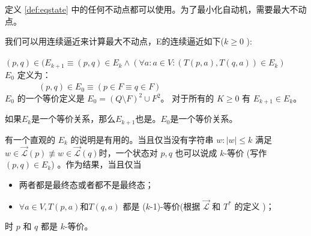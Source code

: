 \begin{remark}
    定义 \ref{def:eqstate} 中的任何不动点都可以使用。为了最小化自动机，需要最大不动点。
\end{remark}


\begin{property}[近似$E$]
    我们可以用连续逼近来计算最大不动点，E的连续逼近如下($ k \ge 0 $ ):\\
　　　　$(p,q) \in (E_{k+1} \equiv (p,q) \in E_k \land (\forall a:a \in V : (T(p,a),T(q,a))\in E_k ) $ \\
$E_0$ 定义为：\\
　　　　$(p,q) \in E_0 \equiv (p \in F \equiv q \in F)  $ \\
$E_0$ 的一个等价定义是 $E_0 = (Q \setminus F)^2 \cup F^2$。 对于所有的 $K \ge 0$ 有 $E_{k+1} \in E_k$。
\end{property}


\begin{remark}
    如果$E_k$是一个等价关系，那么$E_{k+1}$也是。$E_0$是一个等价关系。
\end{remark}


\begin{remark}
    有一个直观的 $E_k$ 的说明是有用的。当且仅当没有字符串 $ w: |w| \leq k $ 满足 $ w \in \overrightarrow{\mathcal{L}}(p) \not\equiv w \in \overrightarrow{\mathcal{L}}(q) $时，一个状态对 $p,q$ 也可以说成 $k$-等价 (写作 $(p,q)\in E_k$) 。作为结果，当且仅当
    \begin{itemize}
        \item 两者都是最终态或者都不是最终态；
        \item  $\forall a\in V,T(p,a) \mbox{和} T(q,a)$ 都是 ($k$-1)-等价(根据 $\overrightarrow{\mathcal{L}}$ 和 $T^*$ 的定义  )；
    \end{itemize}
    时 $p$ 和 $q$ 都是 $k$-等价。
\end{remark}

